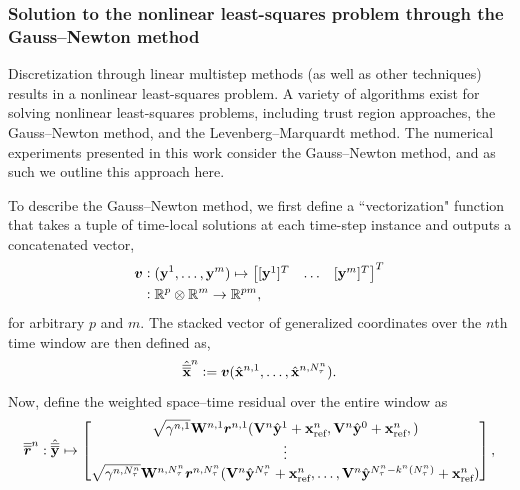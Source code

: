 \subsubsection{Solution to the nonlinear least-squares problem through the Gauss--Newton method}
Discretization through linear multistep methods (as well as other techniques) 
results in a nonlinear least-squares problem.
A variety of algorithms exist for solving nonlinear  
least-squares problems, including trust region approaches, the Gauss–Newton method, and the Levenberg–Marquardt method.  
The numerical experiments presented in this work consider the Gauss--Newton method, and as such we outline this approach here. 

To describe the Gauss--Newton method, we first define a ``vectorization" function that takes a tuple of time-local solutions at each time-step instance and outputs 
a concatenated vector, 
\begin{align*}
 \boldsymbol v &\vcentcolon (\mathbf{y}^{1},\ldots,\mathbf{y}^{m} ) \mapsto \begin{bmatrix} [\mathbf{y}^{1}]^T & \ldots & [\mathbf{y}^{m}]^T \end{bmatrix}^T  \\
&\vcentcolon \mathbb{R}^{p} \otimes \mathbb{R}^{m} \rightarrow \mathbb{R}^{pm},
\end{align*}
for arbitrary $p$ and $m$. The stacked vector of generalized coordinates over the $n$th time window are then defined as, 
\begin{equation*}
\hat{\overline{\overline{\mathbf {x}}}}^{n} \vcentcolon= 
\boldsymbol v (\hat{\mathbf{x}}^{n,1},\ldots,\hat{\mathbf{x}}^{n,N_{\tau}^{n}} ).
\end{equation*}
Now, define the weighted space--time residual over the entire window as
\begin{equation*}
\overline{\overline{\boldsymbol r}}^{n}_{\text{}} : \hat{\overline{\overline{\mathbf{y}}}}^{} \mapsto \begin{bmatrix}
 \sqrt{\gamma^{n,1} } \mathbf{W}^{n,1} \boldsymbol r_{}^{n,1}( \mathbf {V}^{n} \hat{\mathbf{y}}^{1} + \mathbf{x}_\text{ref}^{n},  \mathbf {V}^{n} \hat{\mathbf{y}}^{0} + \mathbf{x}_\text{ref}^{n},) \\
\vdots \\
 \sqrt{\gamma^{n,N_{\tau}^{n}} } \mathbf{W}^{n,N_{\tau}^{n}} \boldsymbol r_{}^{n,N_{\tau}^{n}}( \mathbf {V}^{n} \hat{\mathbf{y}}^{N_{\tau}^{n}} + \mathbf{x}_\text{ref}^{n}, \ldots,\mathbf {V}^{n} \hat{\mathbf{y}}^{N_{\tau}^{n} - k^n(N_{\tau}^{n}) } + \mathbf{x}_\text{ref}^{n}) \\
\end{bmatrix},
\end{equation*}

